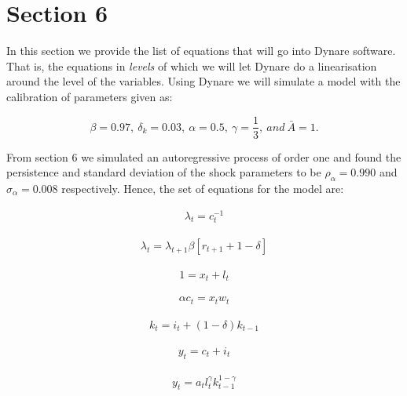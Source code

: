 \documentclass[
  11pt,
  justified]{article}
\begin{document}
\newpage

\hypertarget{section-6}{%
\section{Section 6}\label{section-6}}

In this section we provide the list of equations that will go into
Dynare software. That is, the equations in \emph{levels} of which we
will let Dynare do a linearisation around the level of the variables.
Using Dynare we will simulate a model with the calibration of parameters
given as:

\[
\beta = 0.97, \ \delta_k = 0.03, \ \alpha = 0.5, \ \gamma = \frac{1}{3}, \ and \ \bar A = 1.
\]

From section 6 we simulated an autoregressive process of order one and
found the persistence and standard deviation of the shock parameters to
be \(\rho_{\alpha} = 0.990\) and \(\sigma_\alpha = 0.008\) respectively.
Hence, the set of equations for the model are:

\begin{align} 
\lambda_t = c_t^{-1} \tag{MU of consumption}
\label{eq:mu_of_consumption}
\end{align}

\begin{align}
\lambda_t = \lambda_{t+1} \beta[r_{t+1} + 1 - \delta] \tag{Euler equation}
\label{eq:intertemporal_margin}
\end{align}

\begin{align}
1 = x_t + l_t \tag{Time constraint}
\label{eq:time_constraint}
\end{align}

\begin{align}
\alpha c_t = x_t w_t \tag{Labour supply}
\label{eq:labour_supply}
\end{align}

\begin{align}
k_t = i_t + (1 - \delta)k_{t-1} \tag{Capital accumulation}
\label{eq:cap_accum}
\end{align}

\begin{align}
y_t = c_t + i_t \tag{Market clearing}
\label{eq:market_clearing}
\end{align}

\begin{align}
y_t = a_t l_t^{\gamma} k_{t-1}^{1 - \gamma}  \tag{Production function}
\label{eq:production_function}
\end{align}
\end{document}
